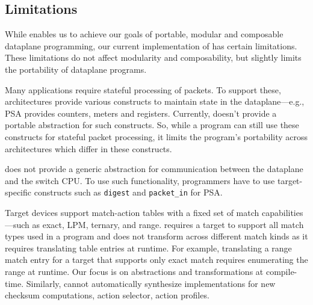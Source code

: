 \documentclass[letterpaper,twocolumn,10pt]{article}
\begin{document}
\subsection{Limitations}
\label{sec:limitations}
While \ulang enables us to achieve our goals of portable, modular and
composable dataplane programming, our current implementation of \ucomp
has certain limitations. These limitations do not affect modularity
and composability, but slightly limits the portability of
dataplane programs.

Many applications require stateful processing of packets. To support
these, architectures provide various constructs to maintain state in
the dataplane---e.g., PSA provides counters, meters and registers.
Currently, \uarch doesn't provide a portable abstraction for such
constructs. So, while a \ulang program can still use these constructs
for stateful packet processing, it limits the program's portability
across architectures which differ in these constructs.

\uarch does not provide a generic abstraction for communication
between the dataplane and the switch CPU. To use such functionality,
programmers have to use target-specific constructs such as
\texttt{digest} and \texttt{packet\_in} for PSA.

Target devices support match-action tables with a fixed set of match
capabilities---such as exact, LPM, ternary, and range. \ulang requires
a target to support all match types used in a program and \ucomp does
not transform across different match kinds as it requires translating
table entries at runtime. For example, translating a range match entry
for a target that supports only exact match requires enumerating the
range at runtime.  Our focus is on abstractions and transformations at
compile-time. Similarly, \ulang cannot automatically synthesize
implementations for new checksum computations, action selector, action
profiles.

\end{document}
